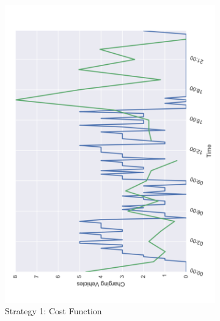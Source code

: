 \documentclass[12pt,a4paper]{article}
\begin{document}
\begin{figure}
\begin{subfigure}[b]{0.45\textwidth}
  \includegraphics[width=\linewidth]{./images/charge1}
  \caption{Strategy 1: Cost Function}
  \label{batterystrat1}
\end{subfigure}
\begin{subfigure}[b]{0.458\textwidth}

\end{subfigure}
\end{figure}
\end{document}
